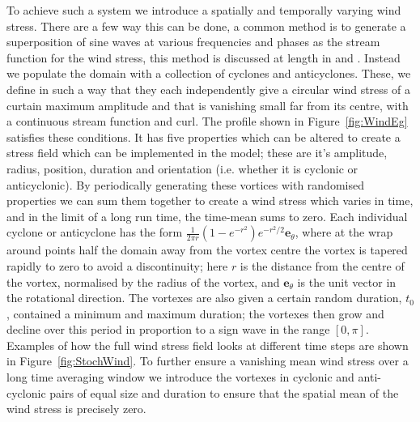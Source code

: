 \documentclass[12pt,a4paper]{report}
\begin{document}
To achieve such a system we introduce a spatially and temporally 
varying wind stress. There are a few  way this can be done, a common method
is to generate a superposition of sine waves at various frequencies and 
phases as the stream function for the wind stress, this method is discussed at
length in \cite{brannigan2015seasonal} and \cite{koszalka2009dynamics}. 
Instead we populate the domain
with a collection of cyclones and       anticyclones. These, we define
in such a way that they each  independently give a circular wind
stress of a curtain maximum amplitude and that is vanishing small far from its centre,
with a continuous stream function      and curl. The profile shown in 
Figure~\ref{fig:WindEg}
satisfies these conditions. It has five properties which can be altered to 
create a stress field which can be implemented in the model; these are it's
amplitude, radius, position, duration and orientation (i.e. whether it is cyclonic
or anticyclonic). By periodically generating these vortices with randomised properties
we can sum them together to create a wind stress which varies in time, and in the limit
of a long run time, the time-mean sums to zero. Each individual cyclone or anticyclone
has the form $\frac{1}{2\pi r}(1-e^{-r^{2}})e^{-r^{2}/2}\boldsymbol{e}_{\theta}$, where
at the wrap around points half the domain away from the vortex centre the vortex is tapered
rapidly to zero to avoid a discontinuity; here $r$ is the distance from the centre of the vortex, normalised by the
radius of the vortex, and $\boldsymbol{e}_{\theta}$ is the unit vector in the 
rotational direction. The vortexes are also given a certain random duration, $t_{0}$, contained a minimum and maximum duration; the vortexes then
grow and decline over this period in proportion to a sign wave in the range $[0,\pi]$.
Examples of how the full wind stress field looks at different
time steps are shown in Figure~\ref{fig:StochWind}. To further ensure a vanishing
mean wind stress over a long time averaging window we introduce the vortexes in cyclonic
and anti-cyclonic pairs of equal size and duration to ensure that the spatial mean
of the wind stress is precisely zero. 
\end{document}
